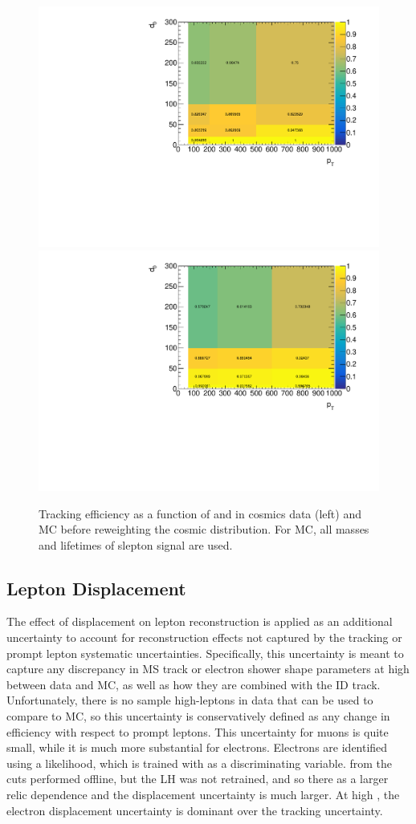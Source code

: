 \begin{figure}[htbp]
\centering
\includegraphics[width=.48\textwidth]{figures/LRT_systs/cosmics_rp3_dzp20_zzp20_z0120_Rgd0_timing_idcuts_eff_pt_d0.pdf}
\includegraphics[width=.48\textwidth]{figures/LRT_systs/signal_eff_pt_d0_allmu_rp05_pt30_Rd0_allmass.pdf}
\caption{Tracking efficiency as a function of \pt and \dz in cosmics data (left) and MC before reweighting the cosmic \pt distribution. For MC, all masses and lifetimes of slepton signal are used.}
\label{fig:applrt_syst}
\end{figure}


\subsection{Lepton Displacement}

The effect of displacement on lepton reconstruction is applied as an additional uncertainty to account for reconstruction effects not captured by the tracking or prompt lepton systematic uncertainties. Specifically, this uncertainty is meant to capture any discrepancy in \ac{MS} track or electron shower shape parameters at high \absdz between data and MC, as well as how they are combined with the \ac{ID} track. Unfortunately, there is no sample high-\absdz leptons in data that can be used to compare to MC, so this uncertainty is conservatively defined as any change in efficiency with respect to prompt leptons. This uncertainty for muons is quite small, while it is much more substantial for electrons. Electrons are identified using a likelihood, which is trained with \dz as a discriminating variable. \absdz from the cuts performed offline, but the LH was not retrained, and so there as a larger relic \dz dependence and the displacement uncertainty is much larger. At high \absdz, the electron displacement uncertainty is dominant over the tracking uncertainty.

